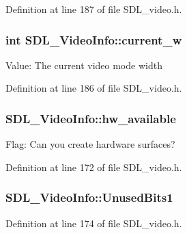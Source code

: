 Definition at line 187 of file S\+D\+L\+\_\+video.\+h.

\hypertarget{struct_s_d_l___video_info_add58e29175b54818092e9dea416fdc7f}{}
\subsubsection[{current\+\_\+w}]{\setlength{\rightskip}{0pt plus 5cm}int S\+D\+L\+\_\+\+Video\+Info\+::current\+\_\+w}\label{struct_s_d_l___video_info_add58e29175b54818092e9dea416fdc7f}
Value\+: The current video mode width 

Definition at line 186 of file S\+D\+L\+\_\+video.\+h.

\hypertarget{struct_s_d_l___video_info_a515e38f0a122a45fe67230e3929670f5}{}
\subsubsection[{hw\+\_\+available}]{ S\+D\+L\+\_\+\+Video\+Info\+::hw\+\_\+available}\label{struct_s_d_l___video_info_a515e38f0a122a45fe67230e3929670f5}
Flag\+: Can you create hardware surfaces? 

Definition at line 172 of file S\+D\+L\+\_\+video.\+h.

\hypertarget{struct_s_d_l___video_info_a1aeb1f930953b9d32a56f978047b5f27}{}
\subsubsection[{Unused\+Bits1}]{ S\+D\+L\+\_\+\+Video\+Info\+::\+Unused\+Bits1}\label{struct_s_d_l___video_info_a1aeb1f930953b9d32a56f978047b5f27}


Definition at line 174 of file S\+D\+L\+\_\+video.\+h.

\hypertarget{struct_s_d_l___video_info_add1b831a063c0a4aed3f2f496096374b}{}
